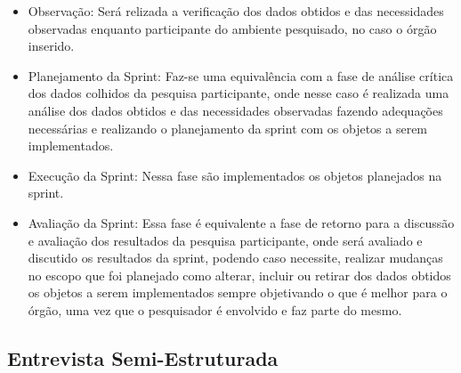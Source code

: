 \begin{itemize}
	\item Observação: Será relizada a verificação dos dados obtidos e das necessidades observadas enquanto participante do ambiente pesquisado, no caso o órgão inserido.
	\item Planejamento da Sprint: Faz-se uma equivalência com a fase de análise crítica dos dados colhidos da pesquisa participante, onde nesse caso é realizada uma análise dos dados obtidos e das necessidades observadas fazendo adequações necessárias e realizando o planejamento da sprint com os objetos a serem implementados.
	\item Execução da Sprint: Nessa fase são implementados os objetos planejados na sprint.
	\item Avaliação da Sprint: Essa fase é equivalente a fase de retorno para a discussão e avaliação dos resultados da pesquisa participante, onde será avaliado e discutido os resultados da sprint, podendo caso necessite, realizar mudanças no escopo que foi planejado como alterar, incluir ou retirar dos dados obtidos os objetos a serem implementados sempre objetivando o que é melhor para o órgão, uma vez que o pesquisador é envolvido e faz parte do mesmo.
\end{itemize}



\subsection{Entrevista Semi-Estruturada}

